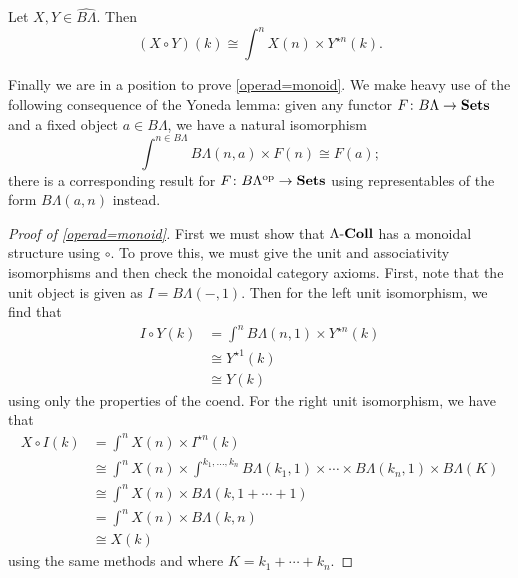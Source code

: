 \begin{prop}
  Let $X, Y \in \widehat{B\Lambda}$. Then
  \[
    (X \circ Y)(k) \cong \int^{n} X(n) \times Y^{\star n}(k).
  \]
\end{prop}

Finally we are in a position to prove \cref{operad=monoid}. We make heavy use of the following consequence of the Yoneda lemma: given any functor $F \colon B\Lambda \rightarrow \mathbf{Sets}$ and a fixed object $a \in B\Lambda$, we have a natural isomorphism
  \[
    \int^{n \in B\Lambda} B\Lambda(n,a) \times F(n) \cong F(a);
  \]
there is a corresponding result for $F \colon B\Lambda^{\textrm{op}} \rightarrow \mathbf{Sets}$ using representables of the form $B\Lambda(a,n)$ instead.

\begin{proof}[Proof of \cref{operad=monoid}]
First we must show that $\Lambda\mbox{-}\mathbf{Coll}$ has a monoidal structure using $\circ$. To prove this, we must give the unit and associativity isomorphisms and then check the monoidal category axioms. First, note that the unit object is given as $I = B\Lambda(-,1)$. Then for the left unit isomorphism, we find that
  \begin{align*}
    I \circ Y (k) &= \int^{n} B\Lambda(n,1) \times Y^{\star n}(k) \\
    &\cong Y^{\star 1}(k) \\
    &\cong Y(k)
  \end{align*}
using only the properties of the coend. For the right unit isomorphism, we have that
  \begin{align*}
    X \circ I (k) &= \int^{n} X(n) \times I^{\star n}(k) \\
    &\cong \int^{n} X(n) \times \int^{k_{1}, \ldots, k_{n}} B\Lambda(k_{1},1) \times \cdots \times B\Lambda(k_{n},1) \times B\Lambda(K) \\
    &\cong \int^{n} X(n) \times B\Lambda(k,1+ \cdots +1) \\
    &= \int^{n} X(n) \times B\Lambda(k,n) \\
    &\cong X(k)
  \end{align*}
using the same methods and where $K = k_1 + \cdots + k_n$.


\end{proof}
